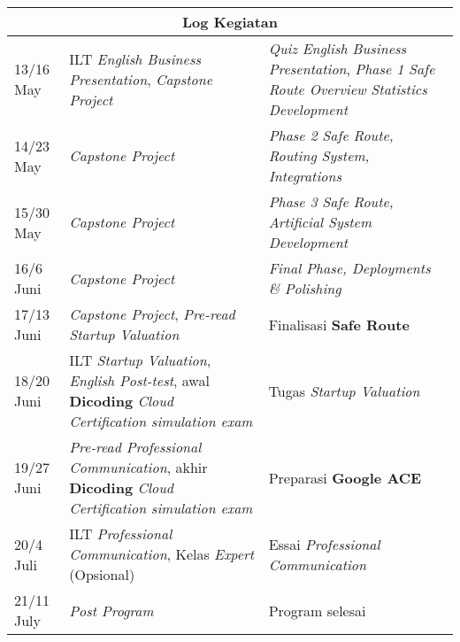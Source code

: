 \begin{tabular}{ |p{3cm}|p{6cm}|p{3cm}|  }
 \hline
 \multicolumn{3}{|c|}{Log Kegiatan} \\
  \hline
  13/16 May & ILT \textit{English Business Presentation}, \textit{Capstone Project} & \textit{Quiz English Business Presentation}, \textit{Phase 1 Safe Route Overview Statistics Development} \\
 \hline
 14/23 May & \textit{Capstone Project} & \textit{Phase 2 Safe Route, Routing System, Integrations}\\
 \hline
 15/30 May & \textit{Capstone Project} & \textit{Phase 3 Safe Route, Artificial System Development}\\
 \hline
 16/6 Juni & \textit{Capstone Project} & \textit{Final Phase, Deployments \& Polishing} \\
 \hline
 17/13 Juni & \textit{Capstone Project}, \textit{Pre-read Startup Valuation} & Finalisasi \textbf{Safe Route} \\
 \hline
 18/20 Juni & ILT \textit{Startup Valuation}, \textit{English Post-test}, awal \textbf{Dicoding} \textit{Cloud Certification simulation exam} & Tugas \textit{Startup Valuation} \\
 \hline
 19/27 Juni & \textit{Pre-read Professional Communication}, akhir \textbf{Dicoding} \textit{Cloud Certification simulation exam} & Preparasi \textbf{Google ACE} \\
 \hline
  20/4 Juli & ILT \textit{Professional Communication}, Kelas \textit{Expert} (Opsional) & Essai \textit{Professional Communication} \\
  \hline
  21/11 July & \textit{Post Program} & Program selesai \\
  \hline
\end{tabular}